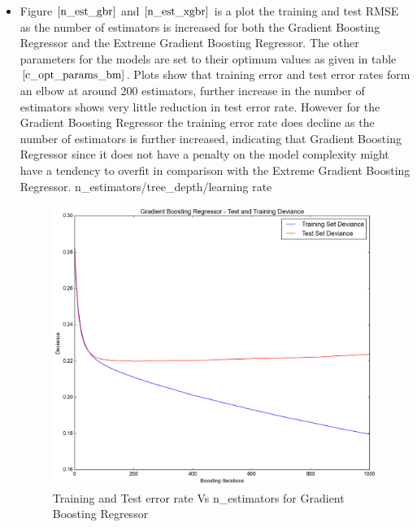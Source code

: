 \documentclass[twoside,12pt]{article}
\begin{document}
\begin{itemize}
\FloatBarrier
\item
Figure $\eqref{n_est_gbr}$ and $\eqref{n_est_xgbr}$ is a plot the training and test RMSE as the number of estimators is increased for both the Gradient Boosting Regressor and the Extreme Gradient Boosting Regressor. The other parameters for the models are set to their optimum values as given in table $\eqref{c_opt_params_bm}$. Plots show that training error and test error rates form an elbow at around 200 estimators, further increase in the number of estimators shows very little reduction in test error rate. However for the  Gradient Boosting Regressor the training error rate does decline as the number of estimators is further increased, indicating that  Gradient Boosting Regressor since it does not have a penalty on the model complexity might have a tendency to overfit in comparison with the Extreme Gradient Boosting Regressor.
 n\_estimators/tree\_depth/learning rate
\begin{figure}[!htbp]
	\centering
	\includegraphics[scale=.43]{DataVisualization/gbr_ed_n.png} 
	\caption{Training and Test error rate Vs n\_estimators for Gradient Boosting Regressor}
	\label{n_est_gbr}
\end{figure}
\begin{figure}[!htbp]
	\centering

\end{figure}
\end{itemize}
\end{document}
